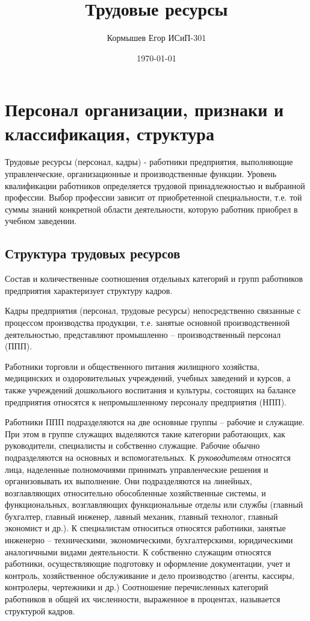\documentclass[11pt]{article}
\author{Кормышев Егор ИСиП-301}
\date{\today}
\title{Трудовые ресурсы}
\begin{document}
\maketitle
\tableofcontents



\section{Персонал организации, признаки и классификация, структура}
\label{sec:org80965f4}

Трудовые ресурсы (персонал, кадры) -  работники предприятия, выполняющие
управленческие, организационные и производственные функции. Уровень квалификации
работников определяется трудовой принадлежностью и выбранной профессии. Выбор
профессии зависит от приобретенной специальности, т.е. той суммы знаний конкретной
области деятельности, которую работник приобрел в учебном заведении.

\subsection{Структура трудовых ресурсов}
\label{sec:org3fa83bd}

Состав и количественные соотношения отдельных категорий и групп работников
предприятия характеризует структуру кадров.

Кадры предприятия (персонал, трудовые ресурсы) непосредственно связанные с
процессом производства продукции, т.е. занятые основной производственной
деятельностью, представляют промышленно – производственный персонал (ППП).

Работники торговли и общественного питания жилищного хозяйства, медицинских и
оздоровительных учреждений, учебных заведений и курсов, а также учреждений
дошкольного воспитания и культуры, состоящих на балансе предприятия относятся к
непромышленному персоналу предприятия (НПП).

Работники ППП подразделяются на две основные группы – рабочие и служащие. При
этом в группе служащих выделяются такие категории работающих, как руководители,
специалисты и собственно служащие. Рабочие обычно подразделяются на основных и
вспомогательных.
К
\emph{руководителям}
относятся лица, наделенные полномочиями принимать
управленческие решения и организовывать их выполнение. Они подразделяются на
линейных, возглавляющих относительно обособленные хозяйственные системы, и
функциональных, возглавляющих функциональные отделы или службы (главный
бухгалтер, главный инженер, лавный механик, главный технолог, главный экономист и
др.).
К
специалистам
относиться относятся работники, занятые инженерно –
техническими,
экономическими,
бухгалтерскими,
юридическими
аналогичными видами деятельности.
К собственно служащим относятся работники, осуществляющие подготовку и
оформление документации, учет и контроль, хозяйственное обслуживание и дело
производство (агенты, кассиры, контролеры, чертежники и др.)
Соотношение перечисленных категорий работников в общей их численности,
выраженное в процентах, называется структурой кадров.
\end{document}
